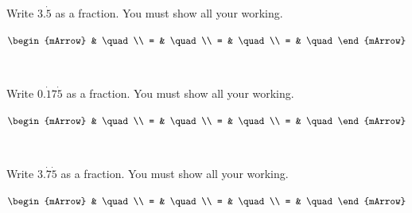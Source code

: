 \begin{mtask}[resume]
    \task Write $3.\dot{5}$ as a fraction. You must show all your working.  
	  \begin{exercise} 
         \begin{envSolution}
             $\begin{mArrow}
                          &  \quad      \\
					    = &  \quad                  \\
     				    = &  \quad                    \\ 
            			= &  \quad			
				    \end{mArrow}$			   
                \begin{shortsolution}  
			       $   \quad $
			    \end{shortsolution}				 
        \end{envSolution}
      \end{exercise}	  

	  
    \task Write $0.\dot{1}7\dot{5}$ as a fraction. You must show all your working.  
	  \begin{exercise} 
         \begin{envSolution}
             $\begin{mArrow}
                          &  \quad      \\
					    = &  \quad                  \\
     				    = &  \quad                    \\ 
            			= &  \quad			
				    \end{mArrow}$			   
                \begin{shortsolution}  
			       $   \quad $
			    \end{shortsolution}				 
        \end{envSolution}
      \end{exercise}	  

    \task Write $3.\dot{7}\dot{5}$ as a fraction. You must show all your working.  
	  \begin{exercise} 
         \begin{envSolution}
             $\begin{mArrow}
                          &  \quad      \\
					    = &  \quad                  \\
     				    = &  \quad                    \\ 
            			= &  \quad			
				    \end{mArrow}$			   
                \begin{shortsolution}  
			       $   \quad $
			    \end{shortsolution}				 
        \end{envSolution}
      \end{exercise}	  

\end{mtask}




